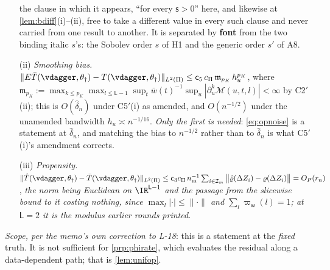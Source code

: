 \begin{lemma}
\begin{enumerate}
the clause in which it appears, ``for every $\mathsf s>0$'' here, and likewise at
\cref{lem:bdiff}\textup{(i)}--(ii), free to take a different value in every such clause and never
carried from one result to another. It is separated by \textbf{font} from the two binding italic
$s$'s: the Sobolev order $s$ of H1 and the generic order $s'$ of A8.
\item[(ii)] \emph{Smoothing bias.} $\|E\bar T(\vdagger,\theta_\dagger)-T(\vdagger,\theta_\dagger)\|_{L^{2}(\Pi)}
\le\mathsf c_5\,c_\Pi\,\mathfrak m_{p_K}\,h_u^{p_K}$, where
$\mathfrak m_{p_K}:=\max_{k\le p_K}\max_{l\le\mathsf L-1}\sup_t\bar w(t)^{-1}\sup_u|\partial_u^{k}\mathcal M(u,t,l)|<\infty$ by
C2$'$(ii); this is $O(\hat\delta_n)$ under C5$'$(i) as amended, and $O(n^{-1/2})$ under the unamended
bandwidth $h_u\asymp n^{-1/16}$. \emph{Only the first is needed}: \eqref{eq:opnoise} is a statement at
$\hat\delta_n$, and matching the bias to $n^{-1/2}$ rather than to $\hat\delta_n$ is what C5$'$(i)'s
amendment corrects.
\item[(iii)] \emph{Propensity.}
$\|\hat T(\vdagger,\theta_\dagger)-\bar T(\vdagger,\theta_\dagger)\|_{L^{2}(\Pi)}
\le\mathsf c_3c_\Pi\,n_{\mathrm m}^{-1}\sum_{i\in\mathcal I_m}\big\|\hat\varrho(\Delta Z_i)-\varrho(\Delta Z_i)\big\|
=O_P(r_n)$, \emph{the norm being Euclidean on $\IR^{\mathsf L-1}$ and the passage from the slicewise
bound to it costing nothing, since $\max_l|\cdot|\le\|\cdot\|$ and $\sum_l\varpi_{\mathsf w}(l)=1$; at
$\mathsf L=2$ it is the modulus earlier rounds printed}.
\end{enumerate}
\emph{Scope, per the memo's own correction to L-18}: this is a statement at the \emph{fixed} truth. It
is not sufficient for \cref{prp:phirate}, which evaluates the residual along a data-dependent path;
that is \cref{lem:unifop}.
\end{lemma}

